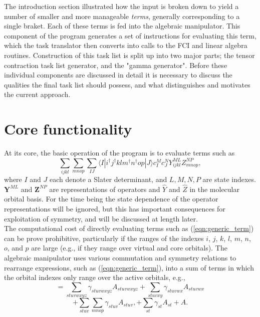 \noindent The introduction section illustrated how the input is broken down to
yield a number of smaller and more manageable \emph{terms}, generally
corresponding to a single braket. Each of these terms is fed into the algebraic
manipulator. This component of the program generates a set of instructions
for evaluating this term, which the task translator then converts into calls to the FCI
and linear algebra routines. Construction of this task list is split up into two major
parts; the tensor contraction task list generator, and the "gamma generator".
Before these individual components are discussed in detail it is
necessary to discuss the qualities the final task list should possess, and what
distinguishes and motivates the current approach. \\

\section{Core functionality}
\noindent At its core, the basic operation of the program is to evaluate terms such as 
\begin{equation}
\sum_{ijkl}\sum_{mnop} \sum_{IJ} \langle I | i^{\dagger}j^{\dagger}klm^{\dagger}n^{\dagger}op | J \rangle c^{M}_{I} c_{J}^{N} Y^{ML}_{ijkl}Z^{NP}_{mnop},
\label{eqn:generic_term}
\end{equation}
where $I$ and $J$ each denote a Slater determinant, and $L,M,N,P$ are state
indexes.  $\mathbf{Y}^{ML}$ and $\mathbf{Z}^{NP}$ are representations of
operators and $\hat{Y}$ and $\hat{Z}$ in the molecular orbital basis. For the time being
the state dependence of the operator representations will be ignored, but this has important consequences
for exploitation of symmetry, and will be discussed at length later. \\ 

\noindent The computational cost of directly evaluating terms such as (\ref{eqn:generic_term}) can be prove prohibitive,
particularly if the ranges of the indexes $i$, $j$, $k$, $l$, $m$, $n$, $o$, and $p$ are large (e.g., if they
range over virtual and core orbitals). The algebraic manipulator uses various commutation and symmetry relations
to rearrange expressions, such as (\ref{eqn:generic_term}), into a sum of terms in which
the orbital indexes only range over the active orbitals, e.g.,
\begin{equation}
=\sum_{stuvwxyz}\gamma_{stuvwxyz} A_{stuvwxyz}
+\sum_{stuvxy} \gamma_{stuvwx} A_{stuvwx}
\end{equation}
\begin{equation}
+\sum_{stuv}\sum_{mnop} \gamma_{stuv} A_{stuv},
+\sum_{st} \gamma_{st}  A_{st}
+  A .
\label{eqn:A_list}
\end{equation}

